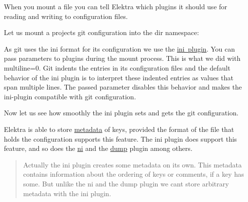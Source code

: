 When you mount a file you can tell Elektra which plugins it should use for reading and writing to configuration files.

Let us mount a projects git configuration into the dir namespace\+:


\begin{DoxyCode}{0}
\DoxyCodeLine{}
\DoxyCodeLine{}
\end{DoxyCode}


As git uses the {\ttfamily ini} format for its configuration we use the \mbox{\hyperlink{autotoc_md292_src_plugins_ini_README_md}{ini plugin}}. You can pass parameters to plugins during the mount process. This is what we did with {\ttfamily multiline=0}. Git indents the entries in its configuration files and the default behavior of the {\ttfamily ini} plugin is to interpret these indented entries as values that span multiple lines. The passed parameter disables this behavior and makes the ini-\/plugin compatible with git configuration.

Now let us see how smoothly the ini plugin sets and gets the git configuration.


\begin{DoxyCode}{0}
\DoxyCodeLine{}
\DoxyCodeLine{}
\DoxyCodeLine{}
\end{DoxyCode}


Elektra is able to store \mbox{\hyperlink{doc_help_elektra-metadata_md}{metadata}} of keys, provided the format of the file that holds the configuration supports this feature. The ini plugin does support this feature, and so does the \mbox{\hyperlink{autotoc_md500_src_plugins_ni_README_md}{ni}} and the \mbox{\hyperlink{autotoc_md198_src_plugins_dump_README_md}{dump}} plugin among others.

\begin{quote}
Actually the ini plugin creates some metadata on its own. This metadata contains information about the ordering of keys or comments, if a key has some. But unlike the ni and the dump plugin we can\textquotesingle{}t store arbitrary metadata with the ini plugin. \end{quote}


